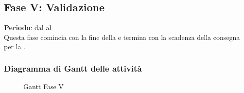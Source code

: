 \subsection{Fase V: Validazione}
	\textbf{Periodo}: dal  al  \\Questa fase comincia con la fine della  e termina con la scadenza della consegna per la .
	\subsubsection{Diagramma di Gantt delle attività}
		\begin{figure}\centering
		\caption{Gantt Fase V}
\end{figure}
